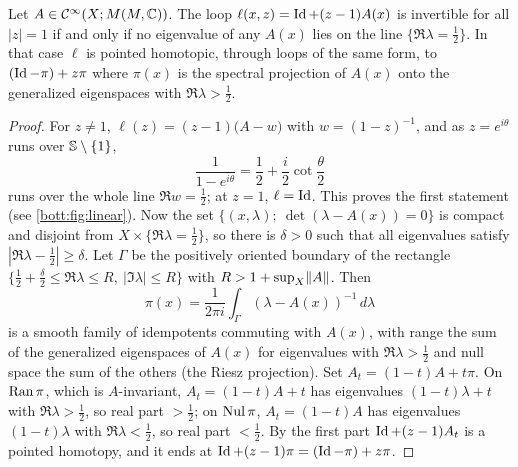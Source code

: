 \begin{lemma}\label{bott:lem:linear}
  Let $A\in\mathcal{C}^\infty(X;M(M,\mathbb{C}))$. The loop $\ell(x,z)=\operatorname{Id}+(z-1)A(x)$ is invertible for all
  $|z|=1$ if and only if no eigenvalue of any $A(x)$ lies on the line
  $\{\Re\lambda=\frac12\}$. In that case $\ell$ is pointed homotopic, through loops
  of the same form, to $(\operatorname{Id}-\pi)+z\pi$ where $\pi(x)$ is the spectral projection of
  $A(x)$ onto the generalized eigenspaces with $\Re\lambda>\frac12$.
\end{lemma}
\begin{proof}
  For $z\ne1$, $\ell(z)=(z-1)\big(A-w\big)$ with $w=(1-z)^{-1}$, and as $z=e^{i\theta}$
  runs over $\mathbb{S}\setminus\{1\}$,
  \begin{equation*}
    \frac1{1-e^{i\theta}}=\frac12+\frac i2\cot\frac\theta2
  \end{equation*}
  runs over the whole line $\Re w=\frac12$; at $z=1$, $\ell=\operatorname{Id}$. This proves the first
  statement (see \cref{bott:fig:linear}). Now the set $\{(x,\lambda);\ \det(\lambda-A(x))=0\}$ is compact and
  disjoint from $X\times\{\Re\lambda=\frac12\}$, so there is $\delta>0$ such that all
  eigenvalues satisfy $|\Re\lambda-\frac12|\ge\delta$. Let $\Gamma$ be the positively
  oriented boundary of the rectangle
  $\{\frac12+\frac\delta2\le\Re\lambda\le R,\ |\Im\lambda|\le R\}$ with
  $R>1+\sup_X\lVert A\rVert$. Then
  \begin{equation*}
    \pi(x)=\frac1{2\pi i}\int_\Gamma(\lambda-A(x))^{-1}\,d\lambda
  \end{equation*}
  is a smooth family of idempotents commuting with $A(x)$, with range the sum of the
  generalized eigenspaces of $A(x)$ for eigenvalues with $\Re\lambda>\frac12$ and null
  space the sum of the others (the Riesz projection). Set $A_t=(1-t)A+t\pi$. On
  $\operatorname{Ran}\pi$, which is $A$-invariant, $A_t=(1-t)A+t$ has eigenvalues $(1-t)\lambda+t$
  with $\Re\lambda>\frac12$, so real part $>\frac12$; on $\operatorname{Nul}\pi$, $A_t=(1-t)A$ has
  eigenvalues $(1-t)\lambda$ with $\Re\lambda<\frac12$, so real part $<\frac12$. By the
  first part $\operatorname{Id}+(z-1)A_t$ is a pointed homotopy, and it ends at
  $\operatorname{Id}+(z-1)\pi=(\operatorname{Id}-\pi)+z\pi$.
\end{proof}

